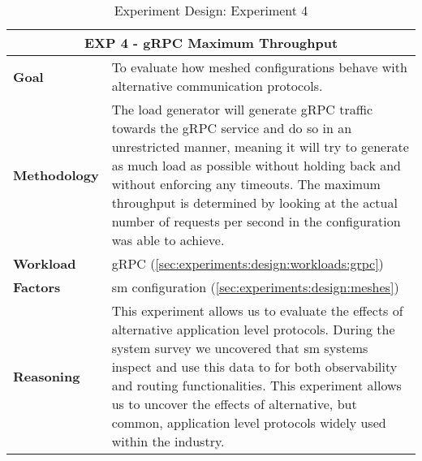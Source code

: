 \begin{table}[!t]
    \centering

    \begin{tabularx}{\textwidth}{l X}
    
        \toprule
        \multicolumn{2}{c}{\textbf{EXP 4 - gRPC Maximum Throughput}}  \\
        \toprule
        
        \textbf{Goal}
        & To evaluate how meshed configurations behave with alternative communication protocols. \\
        \midrule
        
        \textbf{Methodology}
        & The load generator will generate gRPC traffic towards the gRPC service and do so in an unrestricted manner, meaning it will try to generate as much load as possible without holding back and without enforcing any timeouts. The maximum throughput is determined by looking at the actual number of requests per second in the configuration was able to achieve. \\
        \midrule
        
        \textbf{Workload} 
        & gRPC (\cref{sec:experiments:design:workloads:grpc}) \\
        \midrule

        \multirow{1}{*}{\textbf{Factors}} 
        & \Gls{sm} configuration (\cref{sec:experiments:design:meshes}) \\
        \midrule
        
        \textbf{Reasoning}
        & This experiment allows us to evaluate the effects of alternative application level protocols. During the system survey we uncovered that \gls{sm} systems inspect and use this data to for both observability and routing functionalities. This experiment allows us to uncover the effects of alternative, but common, application level protocols widely used within the industry. \\

        \bottomrule

    \end{tabularx}
    \caption[Experiment Design: Experiment 4]{Experiment Design: Experiment 4}
    \label{tab:experiment:design:04}
\end{table}